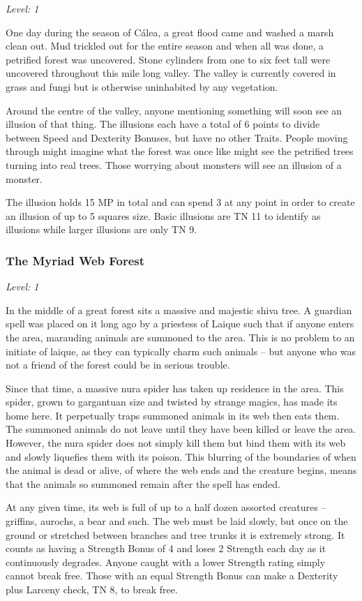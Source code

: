\textit{Level: 1}

One day during the season of C\'{a}lea, a great flood came and washed a marsh clean out.  Mud trickled out for the entire season and when all was done, a petrified forest was uncovered.  Stone cylinders from one to six feet tall were uncovered throughout this mile long valley.  The valley is currently covered in grass and fungi but is otherwise uninhabited by any vegetation.

Around the centre of the valley, anyone mentioning something will soon see an illusion of that thing.  The illusions each have a total of 6 points to divide between Speed and Dexterity Bonuses, but have no other Traits.  People moving through might imagine what the forest was once like might see the petrified trees turning into real trees.  Those worrying about monsters will see an illusion of a monster.

The illusion holds 15 MP in total and can spend 3 at any point in order to create an illusion of up to 5 squares size.  Basic illusions are TN 11 to identify as illusions while larger illusions are only TN 9.

\subsubsection{The Myriad Web Forest}

\textit{Level: 1}

In the middle of a great forest sits a massive and majestic shiva tree.  A guardian spell was placed on it long ago by a priestess of Laique such that if anyone enters the area, marauding animals are summoned to the area. This is no problem to an initiate of laique, as they can typically charm such animals -- but anyone who was not a friend of the forest could be in serious trouble.

Since that time, a massive nura spider has taken up residence in the area.  This spider, grown to gargantuan size and twisted by strange magics, has made its home here.  It perpetually traps summoned animals in its web then eats them.  The summoned animals do not leave until they have been killed or leave the area.  However, the nura spider does not simply kill them but bind them with its web and slowly liquefies them with its poison.  This blurring of the boundaries of when the animal is dead or alive, of where the web ends and the creature begins, means that the animals so summoned remain after the spell has ended.

At any given time, its web is full of up to a half dozen assorted creatures -- griffins, aurochs, a bear and such.  The web must be laid slowly, but once on the ground or stretched between branches and tree trunks it is extremely strong.  It counts as having a Strength Bonus of 4 and loses 2 Strength each day as it continuously degrades.  Anyone caught with a lower Strength rating simply cannot break free.  Those with an equal Strength Bonus can make a Dexterity plus Larceny check, TN 8, to break free.

